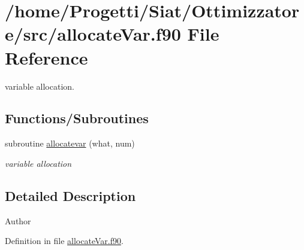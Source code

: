 \hypertarget{allocate_var_8f90}{\section{/home/\-Progetti/\-Siat/\-Ottimizzatore/src/allocate\-Var.f90 File Reference}
\label{allocate_var_8f90}
}


variable allocation.  


\subsection*{Functions/\-Subroutines}
\begin{DoxyCompactItemize}
\item 
subroutine \hyperlink{allocate_var_8f90_ab05eb79f2192fe599c8b251796a49963}{allocatevar} (what, num)
\begin{DoxyCompactList}\small\item\em variable allocation \end{DoxyCompactList}\end{DoxyCompactItemize}


\subsection{Detailed Description}
\begin{DoxyAuthor}{Author}

\end{DoxyAuthor}


Definition in file \hyperlink{allocate_var_8f90_source}{allocate\-Var.\-f90}.



